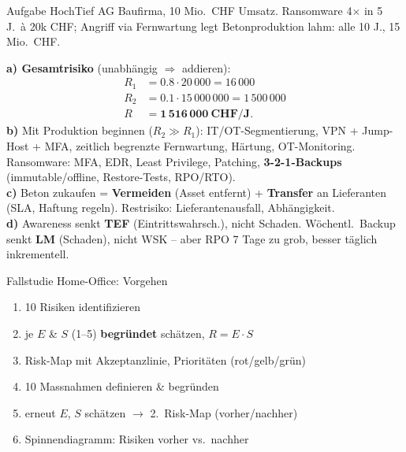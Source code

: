 \documentclass[a4paper, fontsize=7pt]{scrartcl}
\begin{document}
\begin{subbox}{Aufgabe HochTief AG}
Baufirma, 10 Mio.\ CHF Umsatz. Ransomware 4$\times$ in 5 J.\ à 20k CHF;
Angriff via Fernwartung legt Betonproduktion lahm: alle 10 J., 15 Mio.\ CHF.

\textbf{a) Gesamtrisiko} (unabhängig $\Rightarrow$ addieren):
\begin{align*}
R_1 &= 0.8 \cdot 20\,000 = 16\,000 \\
R_2 &= 0.1 \cdot 15\,000\,000 = 1\,500\,000 \\
R &= \mathbf{1\,516\,000\ \textbf{CHF/J.}}
\end{align*}
\textbf{b)} Mit Produktion beginnen ($R_2 \gg R_1$): IT/OT-Segmentierung,
VPN + Jump-Host + MFA, zeitlich begrenzte Fernwartung, Härtung, OT-Monitoring.
Ransomware: MFA, EDR, Least Privilege, Patching, \textbf{3-2-1-Backups}
(immutable/offline, Restore-Tests, RPO/RTO).\\
\textbf{c)} Beton zukaufen = \textbf{Vermeiden} (Asset entfernt) +
\textbf{Transfer} an Lieferanten (SLA, Haftung regeln). Restrisiko:
Lieferantenausfall, Abhängigkeit.\\
\textbf{d)} Awareness senkt \textbf{TEF} (Eintrittswahrsch.), nicht
Schaden. Wöchentl.\ Backup senkt \textbf{LM} (Schaden), nicht WSK --
aber RPO 7 Tage zu grob, besser täglich inkrementell.
\end{subbox}

\begin{subbox}{Fallstudie Home-Office: Vorgehen}
\begin{enumerate}
    \item 10 Risiken identifizieren
    \item je $E$ \& $S$ (1--5) \textbf{begründet} schätzen, $R = E \cdot S$
    \item Risk-Map mit Akzeptanzlinie, Prioritäten (rot/gelb/grün)
    \item 10 Massnahmen definieren \& begründen
    \item erneut $E$, $S$ schätzen $\to$ 2.\ Risk-Map (vorher/nachher)
    \item Spinnendiagramm: Risiken vorher vs.\ nachher
\end{enumerate}
\end{subbox}
\end{document}
